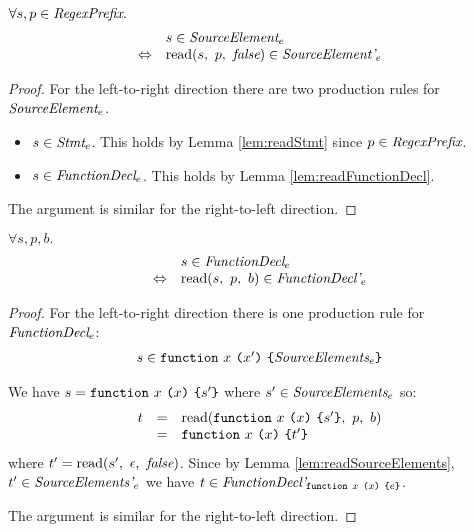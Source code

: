 \documentclass[preprint,10pt]{sigplanconf}
\begin{document}
\begin{lemma}\mbox{}
  
  \( \forall s, p \in \textit{RegexPrefix}. \)
  \[
  \begin{array}{rl}
  &s \in \textit{SourceElement}_{e} 
  \\
  \Leftrightarrow &
  \textrm{read}(s,~p,~\textit{false}) \in \textit{SourceElement'}_{e}
  \end{array}
  \]
\end{lemma}
\begin{proof}
  For the left-to-right direction there are two production rules for 
  \( \textit{SourceElement}_{e} \).
  \begin{itemize}
  \item \( s \in \textit{Stmt}_{e} \).
    This holds by Lemma \ref{lem:readStmt} since \( p \in \textit{RegexPrefix} \).
    
  \item \( s \in \textit{FunctionDecl}_{e} \). This holds by Lemma
    \ref{lem:readFunctionDecl}.
  \end{itemize}

  The argument is similar for the right-to-left direction.
\end{proof}

\begin{lemma}\mbox{}
  
  \( \forall s, p, b. \)
  \[
  \begin{array}{rl}
  &s \in \textit{FunctionDecl}_{e} 
  \\
  \Leftrightarrow &
  \textrm{read}(s,~p,~b) \in \textit{FunctionDecl'}_{e} 
  \end{array}
  \]
\end{lemma}
\begin{proof}
  For the left-to-right direction there is one production rule for
  \( \textit{FunctionDecl}_{e} \):
  \[ 
  \begin{array}{lcl}
  s \in
  \texttt{function}~x~\texttt{(}x'\texttt{)}~\texttt{\{}\textit{SourceElements}_{e}\texttt{\}}
  \end{array}
  \]

 We have \( s = \texttt{function}~x~\texttt{(}x\texttt{)}~\texttt{\{}s'\texttt{\}}
 \) where \( s' \in \textit{SourceElements}_{e} \) so:
 \[
 \begin{array}{rcl}
   t &=& \textrm{read}(\texttt{function}~x~\texttt{(}x\texttt{)}~\texttt{\{}s'\texttt{\}},~p,~b)
   \\
   &=& \texttt{function}~x~\texttt{(}x\texttt{)}~\texttt{\{}t'\texttt{\}}
 \end{array}
 \]
 where \( t' = \textrm{read}(s',~\epsilon,~\textit{false}) \). 
 Since by Lemma \ref{lem:readSourceElements},
 \( t' \in \textit{SourceElements'}_{e} \) we have \( t \in \textit{FunctionDecl'}_{\texttt{function}~x~\texttt{(}x\texttt{)}~\texttt{\{}e\texttt{\}}} \).
 
 The argument is similar for the right-to-left direction.
\end{proof}
\end{document}
